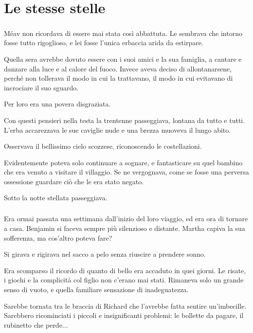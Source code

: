 \documentclass[a4paper,12pt]{book}
\begin{document}
\chapter{Le stesse stelle}

\paragraph{}
Méav non ricordava di essere mai stata così abbattuta. Le sembrava che intorno
fosse tutto rigoglioso, e lei fosse l'unica erbaccia arida da estirpare.

Quella sera avrebbe dovuto essere con i suoi amici e la sua famiglia, a cantare
e danzare alla luce e al calore del fuoco. Invece aveva deciso di
allontanarsene, perché non tollerava il modo in cui la trattavano, il modo in
cui evitavano di incrociare il suo sguardo.

Per loro era una povera disgraziata.

Con questi pensieri nella testa la trentenne passeggiava, lontana da tutto e
tutti. L'erba accarezzava le sue caviglie nude e una brezza muoveva il lungo
abito.

Osservava il bellissimo cielo scozzese, riconoscendo le costellazioni.

Evidentemente poteva solo continuare a sognare, e fantasticare su quel bambino
che era venuto a visitare il villaggio. Se ne vergognava, come se fosse una
perversa ossessione guardare ciò che le era stato negato.

Sotto la notte stellata passeggiava.

\paragraph{}
Era ormai passata una settimana dall'inizio del loro viaggio, ed era ora di
tornare a casa. Benjamin si faceva sempre più silenzioso e distante. Martha
capiva la sua sofferenza, ma cos'altro poteva fare?

Si girava e rigirava nel sacco a pelo senza riuscire a prendere sonno.

Era scomparso il ricordo di quanto di bello era accaduto in quei giorni. Le
risate, i giochi e la complicità col figlio non c'erano mai stati. Rimaneva
solo un grande senso di vuoto, e quella familiare sensazione di inadeguatezza.

Sarebbe tornata tra le braccia di Richard che l'avrebbe fatta sentire
un'imbecille. Sarebbero ricominciati i piccoli e insignificanti problemi: le
bollette da pagare, il rubinetto che perde...
\end{document}
